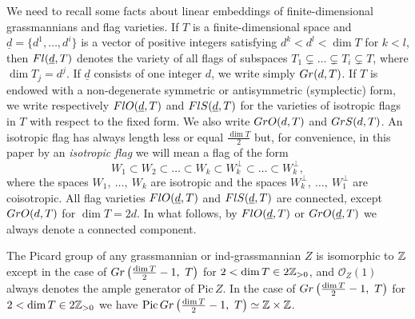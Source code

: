 \documentclass[11pt, a4paper]{article}
\begin{document}
We need to recall some facts about linear embeddings of finite-dimensional grassmannians and flag varieties. If $T$ is a finite-dimensional space and $\underline{d}=\{d^1,\ldots,d^i\}$ is a vector of positive integers satisfying $d^k<d^l<\dim T$ for $k<l$, then $Fl(\underline{d},T)$ denotes the variety of all flags of subspaces $T_1\subsetneq \ldots \subsetneq T_i \subsetneq T$, where $\dim T_j=d^j$. If $\underline{d}$ consists of one integer $d$, we write simply $Gr(d,T)$. If $T$ is endowed with a non-degenerate symmetric or antisymmetric (symplectic) form, we write respectively $FlO(\underline{d},T)$ and $FlS(\underline{d},T)$ for the varieties of isotropic flags in $T$ with respect to the fixed form. We also write $GrO(d,T)$ and $GrS(d,T)$. %
An isotropic flag has always length less or equal $\frac{\dim T}{2}$ but, for convenience, in this paper by an \emph{isotropic flag} we will mean a flag of the form $$W_1\subset W_2 \subset \ldots \subset W_k \subset W^{\perp}_k \subset \ldots \subset W^{\perp}_k,$$ where the spaces $W_1,~\ldots,~W_k$ are isotropic and the spaces $W^{\perp}_k,~\ldots,~W^{\perp}_1$ are coisotropic. All flag varieties $FlO(\underline{d},T)$ and $FlS(\underline{d},T)$ are connected, except %
$GrO(d,T)$ for $\dim T=2d$. In what follows, by $FlO(\underline{d},T)$ or $GrO(\underline{d},T)$ we always denote a connected component.

The Picard group of any grassmannian or ind-grassmannian $Z$ is isomorphic to $\mathbb{Z}$ except in the case of $Gr\left(\frac{\dim T}{2}-1,~T\right)$ for $2<\dim T\in 2\mathbb{Z}_{>0}$, and $\mathcal{O}_Z(1)$ always denotes the ample generator of $\mathrm{Pic}\,Z$. In the case of $Gr\left(\frac{\dim T}{2}-1,~T\right)$ for $2<\dim T\in 2\mathbb{Z}_{>0}$ we have $\mathrm{Pic}\, Gr\left(\frac{\dim T}{2}-1,~T\right)\simeq \mathbb{Z} \times \mathbb{Z}$.  
\end{document}
